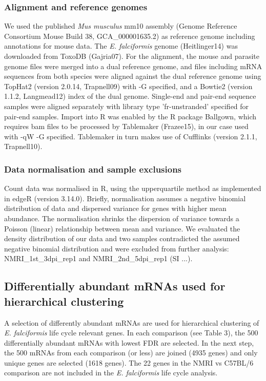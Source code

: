 \documentclass{bmcart}
\begin{document}
\subsubsection{Alignment and reference genomes}
We used the published \textit{Mus musculus} mm10 assembly (Genome Reference Consortium Mouse 
Build 38, GCA\_000001635.2) as reference genome including annotations for mouse data. The
\textit{E. falciformis} genome (Heitlinger14) was downloaded from ToxoDB (Gajria07). For the
alignment, the mouse and parasite genome files were merged into a dual reference genome, and 
files including mRNA sequences from both species were aligned against the dual reference genome
using TopHat2 (version 2.0.14, Trapnell09) with -G specified, and a Bowtie2 (version 1.1.2, Langmead12) index of the dual genome. Single-end and pair-end sequence samples were aligned separately with library type 'fr-unstranded' specified for pair-end samples. Import into R was enabled by the R package Ballgown, which requires bam files to be processed by Tablemaker (Frazee15), in our case used with -qW -G specified. Tablemaker in turn makes use of Cufflinks (version 2.1.1, Trapnell10).

\subsubsection{Data normalisation and sample exclusions}
Count data was normalised in R, using the upperquartile method as implemented in edgeR (version 3.14.0). Briefly, normalisation assumes a negative binomial distribution of data and dispersed variance for genes with higher mean abundance. The normalisation shrinks the dispersion of variance towards a Poisson (linear) relationship between mean and variance. We evaluated the density distribution of our data and two samples contradicted the assumed negative binomial distribution and were excluded from further analysis: NMRI\_1st\_3dpi\_rep1 and NMRI\_2nd\_5dpi\_rep1 (SI ...).

\subsection{Differentially abundant mRNAs used for hierarchical clustering}
A selection of differently abundant mRNAs are used for hierarchical clustering of \textit{E. falciformis} life cycle relevant genes. In each comparison (see Table 3), the 500 differentially abundant mRNAs with lowest FDR are selected. In the next step, the 500 mRNAs from each comparison (or less) are joined (4935 genes) and only unique genes are selected (1618 genes). The 22 genes in the NMRI vs C57BL/6 comparison are not included in the \textit{E. falciformis} life cycle analysis.
\end{document}

